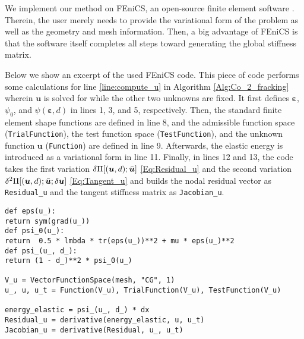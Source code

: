 We implement our method on FEniCS, an open-source finite element software \cite[pp.~173--225]{Logg2012}. Therein, the user merely needs to provide the variational form of the problem as well as the geometry and mesh information. Then, a big advantage of FEniCS is that the software itself completes all steps toward generating the global stiffness matrix.



Below we show an excerpt of the used FEniCS code. This piece of code performs some calculations for line \ref{line:compute_u} in Algorithm \ref{Alg:Co_2_fracking} wherein $\bm{u}$ is solved for while the other two unknowns are fixed. It first defines $\bm{\varepsilon}$, $\psi_0$, and $\psi(\bm{\varepsilon},d)$ in lines 1, 3, and 5, respectively. Then, the standard finite element shape functions are defined in line 8, and the admissible function space (\texttt{TrialFunction}), the test function space (\texttt{TestFunction}), and the unknown function $\bm{u}$ (\texttt{Function}) are defined in line 9. Afterwards, the elastic energy is introduced as a variational form in line 11. Finally, in lines 12 and 13, the code takes the first variation $\delta\Pi[(\bm{u},d);\Bar{\bm{u}}]$ \eqref{Eq:Residual_u} and the second variation $\delta^2\Pi[(\bm{u},d);\Bar{\bm{u}};\delta\bm{u}]$ \eqref{Eq:Tangent_u} and builds the nodal residual vector as \texttt{Residual\_u} and the tangent stiffness matrix as \texttt{Jacobian\_u}.
\begin{lstlisting}
def eps(u_):
return sym(grad(u_))
def psi_0(u_):
return  0.5 * lmbda * tr(eps(u_))**2 + mu * eps(u_)**2
def psi_(u_, d_):
return (1 - d_)**2 * psi_0(u_)

V_u = VectorFunctionSpace(mesh, "CG", 1)
u_, u, u_t = Function(V_u), TrialFunction(V_u), TestFunction(V_u)

energy_elastic = psi_(u_, d_) * dx
Residual_u = derivative(energy_elastic, u, u_t)
Jacobian_u = derivative(Residual, u_, u_t)
\end{lstlisting}



